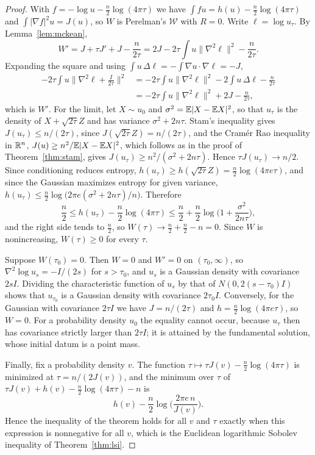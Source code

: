 \begin{proof}
With $f = -\log u-\frac n2\log(4\pi\tau)$ we have $\int fu = h(u)-\frac n2\log(4\pi\tau)$ and $\int|\nabla f|^2u = J(u)$, so $W$ is Perelman's $\mathcal{W}$ with $R = 0$. Write $\ell = \log u_\tau$. By Lemma~\ref{lem:mckean},
\[
W' = J+\tau J'+J-\frac{n}{2\tau} = 2J-2\tau\int u\|\nabla^2\ell\|^2-\frac{n}{2\tau}.
\]
Expanding the square and using $\int u\,\Delta\ell = -\int\nabla u\cdot\nabla\ell = -J$,
\[
\begin{aligned}-2\tau\int u\Big\|\nabla^2\ell+\frac{I}{2\tau}\Big\|^2 &= -2\tau\int u\|\nabla^2\ell\|^2-2\int u\,\Delta\ell-\frac{n}{2\tau}\\ &= -2\tau\int u\|\nabla^2\ell\|^2+2J-\frac{n}{2\tau},\end{aligned}
\]
which is $W'$. For the limit, let $X\sim u_0$ and $\sigma^2 = \mathbb{E}|X-\mathbb{E} X|^2$, so that $u_\tau$ is the density of $X+\sqrt{2\tau}Z$ and has variance $\sigma^2+2n\tau$. Stam's inequality gives $J(u_\tau)\leq n/(2\tau)$, since $J(\sqrt{2\tau}Z) = n/(2\tau)$, and the Cram\'er Rao inequality in $\mathbb{R}^n$, $J(u)\geq n^2/\mathbb{E}|X-\mathbb{E} X|^2$, which follows as in the proof of Theorem~\ref{thm:stam}, gives $J(u_\tau)\geq n^2/(\sigma^2+2n\tau)$. Hence $\tau J(u_\tau)\to n/2$. Since conditioning reduces entropy, $h(u_\tau)\geq h(\sqrt{2\tau}Z) = \frac n2\log(4\pi e\tau)$, and since the Gaussian maximizes entropy for given variance, $h(u_\tau)\leq\frac n2\log\big(2\pi e(\sigma^2+2n\tau)/n\big)$. Therefore
\[
\frac n2\leq h(u_\tau)-\frac n2\log(4\pi\tau)\leq\frac n2+\frac n2\log\Big(1+\frac{\sigma^2}{2n\tau}\Big),
\]
and the right side tends to $\frac n2$, so $W(\tau)\to\frac n2+\frac n2-n = 0$. Since $W$ is nonincreasing, $W(\tau)\geq0$ for every $\tau$.

Suppose $W(\tau_0) = 0$. Then $W = 0$ and $W' = 0$ on $(\tau_0,\infty)$, so $\nabla^2\log u_s = -I/(2s)$ for $s>\tau_0$, and $u_s$ is a Gaussian density with covariance $2sI$. Dividing the characteristic function of $u_s$ by that of $N(0,2(s-\tau_0)I)$ shows that $u_{\tau_0}$ is a Gaussian density with covariance $2\tau_0I$. Conversely, for the Gaussian with covariance $2\tau I$ we have $J = n/(2\tau)$ and $h = \frac n2\log(4\pi e\tau)$, so $W = 0$. For a probability density $u_0$ the equality cannot occur, because $u_\tau$ then has covariance strictly larger than $2\tau I$; it is attained by the fundamental solution, whose initial datum is a point mass.

Finally, fix a probability density $v$. The function $\tau\mapsto\tau J(v)-\frac n2\log(4\pi\tau)$ is minimized at $\tau = n/(2J(v))$, and the minimum over $\tau$ of $\tau J(v)+h(v)-\frac n2\log(4\pi\tau)-n$ is
\[
h(v)-\frac n2\log\Big(\frac{2\pi e\,n}{J(v)}\Big).
\]
Hence the inequality of the theorem holds for all $v$ and $\tau$ exactly when this expression is nonnegative for all $v$, which is the Euclidean logarithmic Sobolev inequality of Theorem~\ref{thm:lsi}.
\end{proof}

